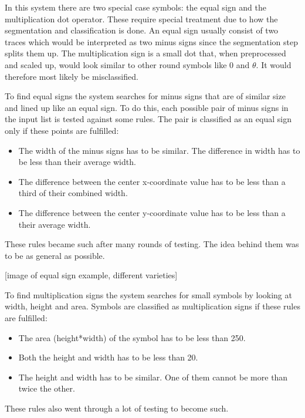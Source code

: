 In this system there are two special case symbols: the equal sign and the multiplication dot operator. These require special treatment due to how the segmentation and classification is done. An equal sign usually consist of two traces which would be interpreted as two minus signs since the segmentation step splits them up. The multiplication sign is a small dot that, when preprocessed and scaled up, would look similar to other round symbols like 0 and $\theta$. It would therefore most likely be misclassified.

To find equal signs the system searches for minus signs that are of similar size and lined up like an equal sign. To do this, each possible pair of minus signs in the input list is tested against some rules. The pair is classified as an equal sign only if these points are fulfilled:

\begin{itemize}
    \setlength\itemsep{0em}
    \item The width of the minus signs has to be similar. The difference in width has to be less than their average width.
    \item The difference between the center x-coordinate value has to be less than a third of their combined width.
    \item The difference between the center y-coordinate value has to be less than a their average width.
\end{itemize}

These rules became such after many rounds of testing. The idea behind them was to be as general as possible.

[image of equal sign example, different varieties]

To find multiplication signs the system searches for small symbols by looking at width, height and area. Symbols are classified as multiplication signs if these rules are fulfilled:

\begin{itemize}
    \setlength\itemsep{0em}
    \item The area (height*width) of the symbol has to be less than 250.
    \item Both the height and width has to be less than 20.
    \item The height and width has to be similar. One of them cannot be more than twice the other.
\end{itemize}

These rules also went through a lot of testing to become such.

